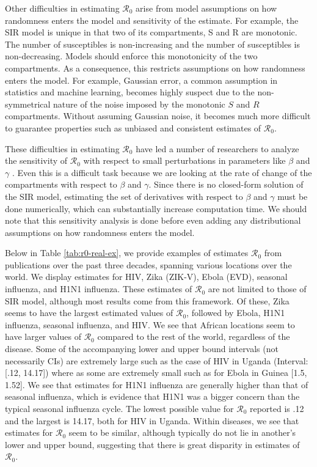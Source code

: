 \documentclass[12pt]{article}
\newcommand{\rr}{\ensuremath{\mathcal{R}_0}}
\begin{document}
Other difficulties in estimating $\rr$ arise from model assumptions on how randomness enters the model and sensitivity of the estimate.  For example, the SIR model is unique in that two of its compartments, S and R are monotonic.  The number of susceptibles is non-increasing and the number of susceptibles is non-decreasing.  Models should enforce this monotonicity of the two compartments.  As a consequence, this restricts assumptions on how randomness enters the model.  For example, Gaussian error, a common assumption in statistics and machine learning, becomes highly suspect due to the non-symmetrical nature of the noise imposed by the monotonic $S$ and $R$ compartments.  Without assuming Gaussian noise, it becomes much more difficult to guarantee properties such as unbiased and consistent estimates of $\rr$.

These difficulties in estimating $\rr$ have led a number of researchers to analyze the sensitivity of $\rr$ with respect to small perturbations in parameters like $\beta$ and $\gamma$ \citep{lash2003,epstein2007agent,capaldi2012}.  Even this is a difficult task because we are looking at the rate of change of the compartments with respect to $\beta$ and $\gamma$.  Since there is no closed-form solution of the SIR model, estimating the set of derivatives with respect to $\beta$ and $\gamma$ must be done numerically, which can substantially increase computation time.  We should note that this sensitivity analysis is done before even adding any distributional assumptions on how randomness enters the model.

Below in Table \ref{tab:r0-real-ex}, we provide examples of estimates $\rr$ from publications over the past three decades, spanning various locations over the world.  We display estimates for HIV, Zika (ZIK-V), Ebola (EVD), seasonal influenza, and H1N1 influenza.  These estimates of $\rr$ are not limited to those of SIR model, although most results come from this framework.  Of these, Zika seems to have the largest estimated values of $\rr$, followed by Ebola, H1N1 influenza, seasonal influenza, and HIV.  We see that African locations seem to have larger values of $\rr$ compared to the rest of the world, regardless of the disease.  Some of the accompanying lower and upper bound intervals (not necessarily CIs) are extremely large such as the case of HIV in Uganda (Interval: [.12, 14.17]) where as some are extremely small such as for Ebola in Guinea [1.5, 1.52].  We see that estimates for H1N1 influenza are generally higher than that of seasonal influenza, which is evidence that H1N1 was a bigger concern than the typical seasonal influenza cycle.  The lowest possible value for $\rr$ reported is .12 and the largest is 14.17, both for HIV in Uganda.  Within diseases, we see that estimates for $\rr$ seem to be similar, although typically do not lie in another's lower and upper bound, suggesting that there is great disparity in estimates of $\rr$.
\end{document}
